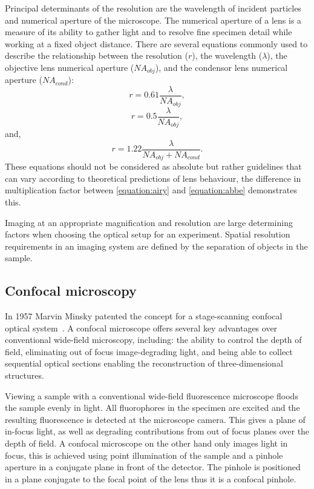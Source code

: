 Principal determinants of the resolution are the wavelength of incident particles and numerical aperture of the microscope. The numerical aperture of a lens is a measure of its ability to gather light and to resolve fine specimen detail while working at a fixed object distance. There are several equations commonly used to describe the relationship between the resolution ($r$), the wavelength ($\lambda$), the objective lens numerical aperture ($NA_{obj}$), and the condensor lens numerical aperture ($NA_{cond}$):
\begin{equation}
r=0.61\frac{\lambda}{NA_{obj}},
\label{equation:airy}
\end{equation}
\begin{equation}
r=0.5\frac{\lambda}{NA_{obj}},
\label{equation:abbe}
\end{equation}
and,
\begin{equation}
r=1.22\frac{\lambda}{NA_{obj} + NA_{cond}}.
\label{equation:resolution}
\end{equation}
These equations should not be considered as absolute but rather guidelines that can vary according to theoretical predictions of lens behaviour, the difference in multiplication factor between \autoref{equation:airy} and \autoref{equation:abbe} demonstrates this.

Imaging at an appropriate magnification and resolution are large determining factors when choosing the optical setup for an experiment. Spatial resolution requirements in an imaging system are defined by the separation of objects in the sample.

\subsection{Confocal microscopy}
\label{introduction:microscopy:confocal}
In 1957 Marvin Minsky patented the concept for a stage-scanning confocal optical system~\cite{Minsky1988}. A confocal microscope offers several key advantages over conventional wide-field microscopy, including: the ability to control the depth of field, eliminating out of focus image-degrading light, and being able to collect sequential optical sections enabling the reconstruction of three-dimensional structures.

Viewing a sample with a conventional wide-field fluorescence microscope floods the sample evenly in light. All fluorophores in the specimen are excited and the resulting fluorescence is detected at the microscope camera. This gives a plane of in-focus light, as well as degrading contributions from out of focus planes over the depth of field. A confocal microscope on the other hand only images light in focus, this is achieved using point illumination of the sample and a pinhole aperture in a conjugate plane in front of the detector. The pinhole is positioned in a plane conjugate to the focal point of the lens thus it is a confocal pinhole.

